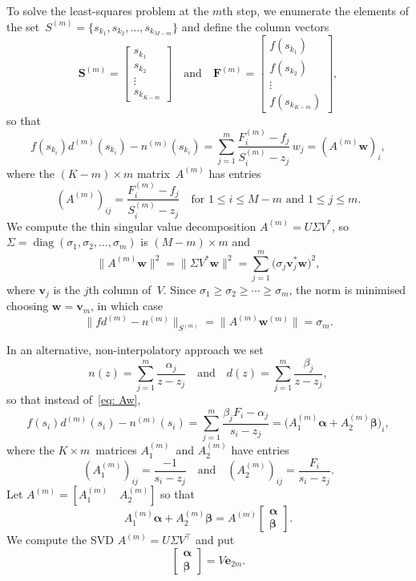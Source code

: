 \documentclass[12pt,a4paper]{article}
\newcommand{\diag}{\operatorname{diag}}
\begin{document}
To solve the least-squares problem at the $m$th step, we enumerate the elements 
of the set~$S^{(m)}=\{s_{k_1},s_{k_2},\ldots,s_{k_{M-m}}\}$ and 
define the column vectors
\[
\boldsymbol{S}^{(m)}=\begin{bmatrix}s_{k_1}\\ s_{k_2}\\ \vdots\\
s_{k_{K-m}}\end{bmatrix}
\quad\text{and}\quad
\boldsymbol{F}^{(m)}=\begin{bmatrix}f(s_{k_1})\\ f(s_{k_2})\\ 
\vdots\\ f(s_{k_{K-m}})\end{bmatrix},
\]
so that
\begin{equation}\label{eq: Aw}
f(s_{k_i})d^{(m)}(s_{k_i})-n^{(m)}(s_{k_i})
    =\sum_{j=1}^m\frac{F^{(m)}_i-f_j}{S^{(m)}_i-z_j}\,w_j
    =(A^{(m)}\boldsymbol{w})_i,
\end{equation}
where the $(K-m)\times m$ matrix~$A^{(m)}$ has entries
\[
(A^{(m)})_{ij}=\frac{F^{(m)}_i-f_j}{S^{(m)}_i-z_j}
\quad\text{for $1\le i\le M-m$ and $1\le j\le m$.}
\]
We compute the thin singular value decomposition $A^{(m)}=U\Sigma V^*$,
so $\Sigma=\diag(\sigma_1,\sigma_2,\ldots,\sigma_m)$ is $(M-m)\times m$ and 
\[
\|A^{(m)}\boldsymbol{w}\|^2=\|\Sigma V^*\boldsymbol{w}\|^2
    =\sum_{j=1}^m\bigl(\sigma_j\boldsymbol{v}_j^*\boldsymbol{w}\bigr)^2,
\]
where $\boldsymbol{v}_j$ is the $j$th column of~$V$.  Since
$\sigma_1\ge\sigma_2\ge\cdots\ge\sigma_m$, the norm is minimised choosing
$\boldsymbol{w}=\boldsymbol{v}_m$, in which case
\[
\|fd^{(m)}-n^{(m)}\|_{S^{(m)}}=\|A^{(m)}\boldsymbol{w}^{(m)}\|=\sigma_m.
\]

In an alternative, non-interpolatory approach we set
\[
n(z)=\sum_{j=1}^m\frac{\alpha_j}{z-z_j}\quad\text{and}\quad
d(z)=\sum_{j=1}^m\frac{\beta_j}{z-z_j},
\]
so that instead of~\eqref{eq: Aw},
\[
f(s_i)d^{(m)}(s_i)-n^{(m)}(s_i)=\sum_{j=1}^m
\frac{\beta_jF_i-\alpha_j}{s_i-z_j}
    =\bigl(A_1^{(m)}\boldsymbol{\alpha}+A_2^{(m)}\boldsymbol{\beta}\bigr)_i,
\]
where the $K\times m$~matrices $A_1^{(m)}$~and $A_2^{(m)}$ have entries
\[
(A_1^{(m)})_{ij}=\frac{-1}{s_i-z_j}\quad\text{and}\quad
(A_2^{(m)})_{ij}=\frac{F_i}{s_i-z_j}.
\]
Let $A^{(m)}=[A_1^{(m)}\quad A_2^{(m)}]$ so that
\[
A_1^{(m)}\boldsymbol{\alpha}+A_2^{(m)}\boldsymbol{\beta}
    =A^{(m)}\begin{bmatrix}\boldsymbol{\alpha}\\ \boldsymbol{\beta} 
\end{bmatrix}.
\]
We compute the SVD $A^{(m)}=U\Sigma V^\top$ and put
\[
\begin{bmatrix}\boldsymbol{\alpha}\\ \boldsymbol{\beta}\end{bmatrix}
    =V\boldsymbol{e}_{2m}.
\]
\end{document}
